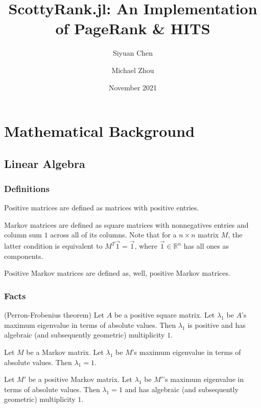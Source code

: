 \documentclass[12pt, titlepage, twoside]{amsart}
\newcommand{\R}{\ensuremath{\mathbb R}}
\begin{document}
\title[ScottyRank.jl]{ScottyRank.jl: An Implementation of PageRank \& HITS}

\author{Siyuan Chen}
\author{Michael Zhou}
\date{November 2021}

\maketitle

\tableofcontents

\section{Mathematical Background}

\subsection{Linear Algebra}

\subsubsection{Definitions}

Positive matrices are defined as matrices with positive entries.

Markov matrices are defined as square matrices with nonnegatives entries and column sum $1$ across all of its columns.
Note that for a $n\times n$ matrix $M$, the latter condition is equivalent to $M^T\vec{1} = \vec{1}$,
where $\vec{1}\in\R^n$ has all ones as components.

Positive Markov matrices are defined as, well, positive Markov matrices.

\subsubsection{Facts}

(Perron-Frobenius theorem)
Let $A$ be a positive square matrix.
Let $\lambda_1$ be $A$'s maximum eigenvalue in terms of absolute values.
Then $\lambda_1$ is positive and has algebraic (and subsequently geometric) multiplicity $1$.

Let $M$ be a Markov matrix.
Let $\lambda_1$ be $M$'s maximum eigenvalue in terms of absolute values.
Then $\lambda_1 = 1$.

Let $M'$ be a positive Markov matrix.
Let $\lambda_1$ be $M'$'s maximum eigenvalue in terms of absolute values.
Then $\lambda_1 = 1$ and has algebraic (and subsequently geometric) multiplicity $1$.
\end{document}
